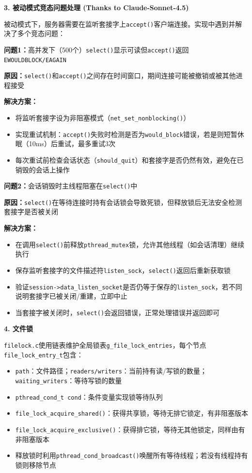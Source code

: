 \documentclass[11pt,a4paper]{article}
\begin{document}
\textbf{3. 被动模式竞态问题处理 (Thanks to Claude-Sonnet-4.5)}

被动模式下，服务器需要在监听套接字上\texttt{accept()}客户端连接。实现中遇到并解决了多个竞态问题：

\textbf{问题1：}高并发下（500个）\texttt{select()}显示可读但\texttt{accept()}返回\texttt{EWOULDBLOCK/EAGAIN}

\textbf{原因：}\texttt{select()}和\texttt{accept()}之间存在时间窗口，期间连接可能被撤销或被其他进程接受

\textbf{解决方案：}
\begin{itemize}[itemsep=0pt]
    \item 将监听套接字设为非阻塞模式（\texttt{net\_set\_nonblocking()}）
    \item 实现重试机制：\texttt{accept()}失败时检测是否为\texttt{would\_block}错误，若是则短暂休眠（10ms）后重试，最多重试3次
    \item 每次重试前检查会话状态（\texttt{should\_quit}）和套接字是否仍然有效，避免在已销毁的会话上操作
\end{itemize}

\textbf{问题2：}会话销毁时主线程阻塞在\texttt{select()}中

\textbf{原因：}\texttt{select()}在等待连接时持有会话锁会导致死锁，但释放锁后无法安全检测套接字是否被关闭

\textbf{解决方案：}
\begin{itemize}[itemsep=0pt]
    \item 在调用\texttt{select()}前释放\texttt{pthread\_mutex}锁，允许其他线程（如会话清理）继续执行
    \item 保存监听套接字的文件描述符\texttt{listen\_sock}，\texttt{select()}返回后重新获取锁
    \item 验证\texttt{session->data\_listen\_socket}是否仍等于保存的\texttt{listen\_sock}，若不同说明套接字已被关闭/重建，立即中止
    \item 当套接字被关闭时，\texttt{select()}会返回错误，正常处理错误并返回即可
\end{itemize}

\textbf{4. 文件锁}

\texttt{filelock.c}使用链表维护全局锁表\texttt{g\_file\_lock\_entries}，每个节点\texttt{file\_lock\_entry\_t}包含：
\begin{itemize}[itemsep=0pt]
    \item \texttt{path}：文件路径；\texttt{readers/writers}：当前持有读/写锁的数量；\texttt{waiting\_writers}：等待写锁的数量
    \item \texttt{pthread\_cond\_t cond}：条件变量实现锁等待队列
    \item \texttt{file\_lock\_acquire\_shared()}：获得共享锁，等待无排它锁定，有非阻塞版本
    \item \texttt{file\_lock\_acquire\_exclusive()}：获得排它锁，等待无其他锁定，同样由有非阻塞版本
    \item 释放锁时利用\texttt{pthread\_cond\_broadcast()}唤醒所有等待线程；若没有线程持有锁则移除节点
\end{itemize}
\end{document}
